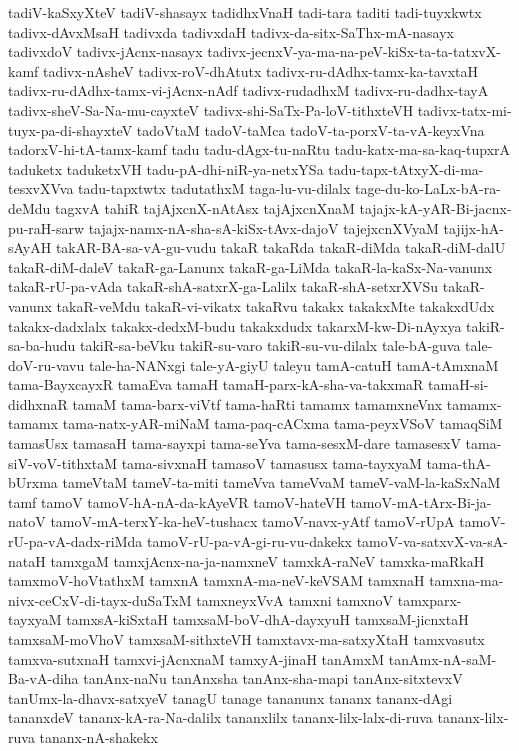 {tadiV-kaSxyXteV
tadiV-shasayx
tadidhxVnaH
tadi-tara
taditi
tadi-tuyxkwtx
tadivx-dAvxMsaH
tadivxda
tadivxdaH
tadivx-da-sitx-SaThx-mA-nasayx
tadivxdoV
tadivx-jAcnx-nasayx
tadivx-jecnxV-ya-ma-na-peV-kiSx-ta-ta-tatxvX-kamf
tadivx-nAsheV
tadivx-roV-dhAtutx
tadivx-ru-dAdhx-tamx-ka-tavxtaH
tadivx-ru-dAdhx-tamx-vi-jAcnx-nAdf
tadivx-rudadhxM
tadivx-ru-dadhx-tayA
tadivx-sheV-Sa-Na-mu-cayxteV
tadivx-shi-SaTx-Pa-loV-tithxteVH
tadivx-tatx-mi-tuyx-pa-di-shayxteV
tadoVtaM
tadoV-taMca
tadoV-ta-porxV-ta-vA-keyxVna
tadorxV-hi-tA-tamx-kamf
tadu
tadu-dAgx-tu-naRtu
tadu-katx-ma-sa-kaq-tupxrA
taduketx
taduketxVH
tadu-pA-dhi-niR-ya-netxYSa
tadu-tapx-tAtxyX-di-ma-tesxvXVva
tadu-tapxtwtx
tadutathxM
taga-lu-vu-dilalx
tage-du-ko-LaLx-bA-ra-deMdu
tagxvA
tahiR
tajAjxcnX-nAtAsx
tajAjxcnXnaM
tajajx-kA-yAR-Bi-jacnx-pu-raH-sarw
tajajx-namx-nA-sha-sA-kiSx-tAvx-dajoV
tajejxcnXVyaM
tajijx-hA-sAyAH
takAR-BA-sa-vA-gu-vudu
takaR
takaRda
takaR-diMda
takaR-diM-dalU
takaR-diM-daleV
takaR-ga-Lanunx
takaR-ga-LiMda
takaR-la-kaSx-Na-vanunx
takaR-rU-pa-vAda
takaR-shA-satxrX-ga-Lalilx
takaR-shA-setxrXVSu
takaR-vanunx
takaR-veMdu
takaR-vi-vikatx
takaRvu
takakx
takakxMte
takakxdUdx
takakx-dadxlalx
takakx-dedxM-budu
takakxdudx
takarxM-kw-Di-nAyxya
takiR-sa-ba-hudu
takiR-sa-beVku
takiR-su-varo
takiR-su-vu-dilalx
tale-bA-guva
tale-doV-ru-vavu
tale-ha-NANxgi
tale-yA-giyU
taleyu
tamA-catuH
tamA-tAmxnaM
tama-BayxcayxR
tamaEva
tamaH
tamaH-parx-kA-sha-va-takxmaR
tamaH-si-didhxnaR
tamaM
tama-barx-viVtf
tama-haRti
tamamx
tamamxneVnx
tamamx-tamamx
tama-natx-yAR-miNaM
tama-paq-cACxma
tama-peyxVSoV
tamaqSiM
tamasUsx
tamasaH
tama-sayxpi
tama-seYva
tama-sesxM-dare
tamasesxV
tama-siV-voV-tithxtaM
tama-sivxnaH
tamasoV
tamasusx
tama-tayxyaM
tama-thA-bUrxma
tameVtaM
tameV-ta-miti
tameVva
tameVvaM
tameV-vaM-la-kaSxNaM
tamf
tamoV
tamoV-hA-nA-da-kAyeVR
tamoV-hateVH
tamoV-mA-tArx-Bi-ja-natoV
tamoV-mA-terxY-ka-heV-tushacx
tamoV-navx-yAtf
tamoV-rUpA
tamoV-rU-pa-vA-dadx-riMda
tamoV-rU-pa-vA-gi-ru-vu-dakekx
tamoV-va-satxvX-va-sA-nataH
tamxgaM
tamxjAcnx-na-ja-namxneV
tamxkA-raNeV
tamxka-maRkaH
tamxmoV-hoVtathxM
tamxnA
tamxnA-ma-neV-keVSAM
tamxnaH
tamxna-ma-nivx-ceCxV-di-tayx-duSaTxM
tamxneyxVvA
tamxni
tamxnoV
tamxparx-tayxyaM
tamxsA-kiSxtaH
tamxsaM-boV-dhA-dayxyuH
tamxsaM-jicnxtaH
tamxsaM-moVhoV
tamxsaM-sithxteVH
tamxtavx-ma-satxyXtaH
tamxvasutx
tamxva-sutxnaH
tamxvi-jAcnxnaM
tamxyA-jinaH
tanAmxM
tanAmx-nA-saM-Ba-vA-diha
tanAnx-naNu
tanAnxsha
tanAnx-sha-mapi
tanAnx-sitxtevxV
tanUmx-la-dhavx-satxyeV
tanagU
tanage
tananunx
tananx
tananx-dAgi
tananxdeV
tananx-kA-ra-Na-dalilx
tananxlilx
tananx-lilx-lalx-di-ruva
tananx-lilx-ruva
tananx-nA-shakekx
}

